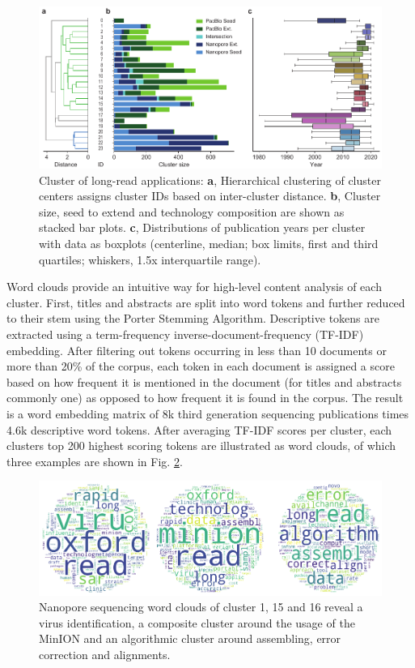 \begin{figure}[h]
	\centering
	\includegraphics[width=1.0\textwidth]{figures/state_of_art/cluster_sizes.pdf}
	\captionsetup{format=plain}
	\caption[Long-Read Application Cluster]{Cluster of long-read applications: \textbf{a}, Hierarchical clustering of cluster centers assigns cluster IDs based on inter-cluster distance. \textbf{b}, Cluster size, seed to extend and technology composition are shown as stacked bar plots. \textbf{c}, Distributions of publication years per cluster with data as boxplots (centerline, median; box limits, first and third quartiles; whiskers, 1.5x interquartile range).}
	\label{fig:state_of_art:cluster_sizes}
\end{figure}

Word clouds provide an intuitive way for high-level content analysis of each cluster.
First, titles and abstracts are split into word tokens and further reduced to their stem using the Porter Stemming Algorithm.
Descriptive tokens are extracted using a term-frequency inverse-document-frequency (TF-IDF) embedding.
After filtering out tokens occurring in less than 10 documents or more than 20\% of the corpus, each token in each document is assigned a score based on how frequent it is mentioned in the document (for titles and abstracts commonly one) as opposed to how frequent it is found in the corpus.
The result is a word embedding matrix of 8k third generation sequencing publications times 4.6k descriptive word tokens.
After averaging TF-IDF scores per cluster, each clusters top 200 highest scoring tokens are illustrated as word clouds, of which three examples are shown in Fig. \ref{fig:state_of_art:wcs_minion}.

\begin{figure}[h]
	\centering
	\includegraphics[width=1.0\textwidth]{figures/state_of_art/wcs_minion.pdf}
	\captionsetup{format=plain}
	\caption[Nanopore Sequencing Word Clouds]{Nanopore sequencing word clouds of cluster 1, 15 and 16 reveal a virus identification, a composite cluster around the usage of the MinION and an algorithmic cluster around assembling, error correction and alignments.}
	\label{fig:state_of_art:wcs_minion}
\end{figure}


